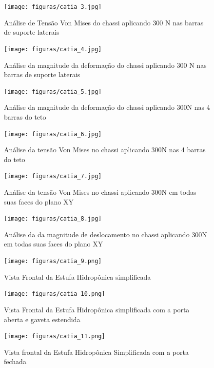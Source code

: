 \begin{figure}[H]
	\centering
	\texttt{[image: figuras/catia\_3.jpg]}
	\caption{Análise de Tensão Von Mises do chassi aplicando 300 N nas barras de suporte laterais} 
	\label{catia_3}
\end{figure}

\begin{figure}[H]
	\centering
	\texttt{[image: figuras/catia\_4.jpg]}
	\caption{Análise da magnitude da deformação do chassi aplicando 300 N nas barras de suporte laterais} 
	\label{catia_4}
\end{figure}

\begin{figure}[H]
	\centering
	\texttt{[image: figuras/catia\_5.jpg]}
	\caption{Análise da magnitude da deformação do chassi aplicando 300N nas 4 barras do teto} 
	\label{catia_5}
\end{figure}

\begin{figure}[H]
	\centering
	\texttt{[image: figuras/catia\_6.jpg]}
	\caption{Análise da tensão Von Mises no chassi aplicando 300N nas 4 barras do teto} 
	\label{catia_6}
\end{figure}

\begin{figure}[H]
	\centering
	\texttt{[image: figuras/catia\_7.jpg]}
	\caption{Análise da tensão Von Mises no chassi aplicando 300N em todas suas faces do plano XY} 
	\label{catia_7}
\end{figure}

\begin{figure}[H]
	\centering
	\texttt{[image: figuras/catia\_8.jpg]}
	\caption{Análise da da magnitude de deslocamento no chassi aplicando 300N em todas suas faces do plano XY} 
	\label{catia_8}
\end{figure}

\begin{figure}[H]
	\centering
	\texttt{[image: figuras/catia\_9.png]}
	\caption{Vista Frontal da Estufa Hidropônica simplificada} 
	\label{catia_9}
\end{figure}

\begin{figure}[H]
	\centering
	\texttt{[image: figuras/catia\_10.png]}
	\caption{Vista Frontal da Estufa Hidropônica simplificada com a porta aberta  e gaveta estendida} 
	\label{catia_10}
\end{figure}

\begin{figure}[H]
	\centering
	\texttt{[image: figuras/catia\_11.png]}
	\caption{Vista frontal da Estufa Hidropônica Simplificada com a porta fechada } 
	\label{catia_11}
\end{figure}
